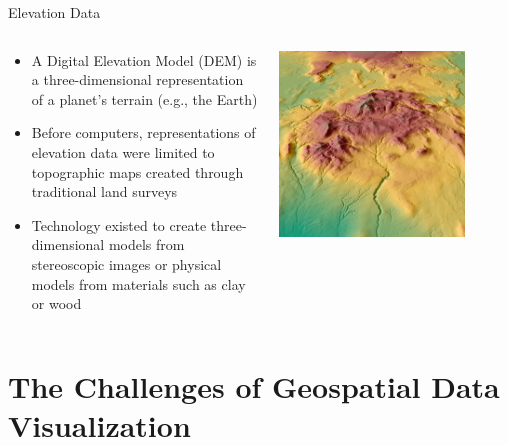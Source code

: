 \documentclass[notes, aspectratio=1610]{beamer}
\begin{document}
\begin{frame}{Elevation Data}{}
	\begin{columns}
		\begin{column}{0.5\textwidth}
		\begin{itemize}
			\item 
			A Digital Elevation Model (DEM) is a three-dimensional 
			representation of a planet's terrain (e.g., the Earth)
			\item 
			Before computers, representations of elevation data were 
			limited to topographic maps created through traditional land 
			surveys
			\item 
			Technology existed to create three-dimensional models from 
			stereoscopic images or physical models from materials such as 
			clay or wood
		\end{itemize}
		\end{column}
		\begin{column}{0.5\textwidth}
		\centering
		\includegraphics[width=0.8\textwidth]{images/worlddem_south_province_iceland_2012.jpg}
		\end{column}
	\end{columns}
\end{frame}

\section{The Challenges of Geospatial Data Visualization}
\end{document}
